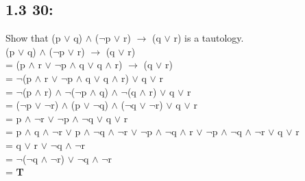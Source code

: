 \documentclass[12pt,en,a4paper]{article}
\begin{document}
	\subsection*{1.3 30:}
	Show that (p $\vee$ q) $\wedge$ ($\neg$p $\vee$ r) $\rightarrow$ (q $\vee$ r) is a tautology.\\
	
	(p $\vee$ q) $\wedge$ ($\neg$p $\vee$ r) $\rightarrow$ (q $\vee$ r)\\
	= (p $\wedge$ r $\vee$ $\neg$p $\wedge$ q $\vee$ q $\wedge$ r) $\rightarrow$ (q $\vee$ r)\\
	= $\neg$(p $\wedge$ r $\vee$ $\neg$p $\wedge$ q $\vee$ q $\wedge$ r) $\vee$ q $\vee$ r\\
	= $\neg$(p $\wedge$ r) $\wedge$ $\neg$($\neg$p $\wedge$ q) $\wedge$ $\neg$(q $\wedge$ r) $\vee$ q $\vee$ r\\
	= ($\neg$p $\vee$ $\neg$r) $\wedge$ (p $\vee$ $\neg$q) $\wedge$ ($\neg$q $\vee$ $\neg$r) $\vee$ q $\vee$ r\\
	= p $\wedge$ $\neg$r $\vee$ $\neg$p $\wedge$ $\neg$q $\vee$ q $\vee$ r\\
	= p $\wedge$ q $\wedge$ $\neg$r $\vee$ p $\wedge$ $\neg$q $\wedge$ $\neg$r $\vee$ $\neg$p $\wedge$ $\neg$q $\wedge$ r $\vee$ $\neg$p $\wedge$ $\neg$q $\wedge$ $\neg$r $\vee$ q $\vee$ r\\
	= q $\vee$ r $\vee$ $\neg$q $\wedge$ $\neg$r\\
	= $\neg$($\neg$q $\wedge$ $\neg$r) $\vee$ $\neg$q $\wedge$ $\neg$r\\
	= \textbf{T}
\end{document}
